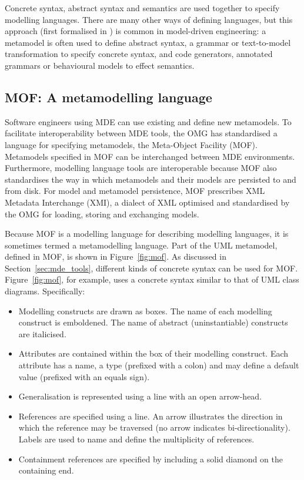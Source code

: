 Concrete syntax, abstract syntax and semantics are used together to specify modelling languages. There are many other ways of defining languages, but this approach (first formalised in \cite{alvarez01mml}) is common in model-driven engineering: a metamodel is often used to define abstract syntax, a grammar or text-to-model transformation to specify concrete syntax, and code generators, annotated grammars or behavioural models to effect semantics.

\subsection{MOF: A metamodelling language}
\label{subsec:mof}
Software engineers using MDE can use existing and define new metamodels. To facilitate interoperability between MDE tools, the OMG has standardised a language for specifying metamodels, the Meta-Object Facility (MOF). Metamodels specified in MOF can be interchanged between MDE environments. Furthermore, modelling language tools are interoperable because MOF also standardises the way in which metamodels and their models are persisted to and from disk. For model and metamodel persistence, MOF prescribes XML Metadata Interchange (XMI), a dialect of XML optimised and standardised by the OMG for loading, storing and exchanging models.

Because MOF is a modelling language for describing modelling languages, it is sometimes termed a metamodelling language. Part of the UML metamodel, defined in MOF, is shown in Figure~\ref{fig:mof}. As discussed in Section~\ref{sec:mde_tools}, different kinds of concrete syntax can be used for MOF. Figure~\ref{fig:mof}, for example, uses a concrete syntax similar to that of UML class diagrams. Specifically:

\begin{itemize}
 \item Modelling constructs are drawn as boxes. The name of each modelling construct is emboldened. The name of abstract (uninstantiable) constructs are italicised.
 \item Attributes are contained within the box of their modelling construct. Each attribute has a name, a type (prefixed with a colon) and may define a default value (prefixed with an equals sign).
 \item Generalisation is represented using a line with an open arrow-head.
 \item References are specified using a line. An arrow illustrates the direction in which the reference may be traversed (no arrow indicates bi-directionality). Labels are used to name and define the multiplicity of references.
 \item Containment references are specified by including a solid diamond on the containing end.
\end{itemize}

